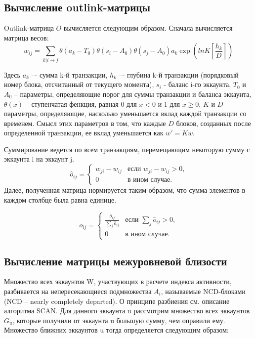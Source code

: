 \documentclass[a4paper,12pt]{article}
\begin{document}
\subsection{Вычисление outlink-матрицы}
Outlink-матрица $O$ вычисляется следующим образом. Сначала вычисляется матрица весов:
$$
w_{ij}=\sum_{k|i \to j} \theta ( a_k - T_0 ) \theta ( s_i - A_0 ) \theta ( s_j - A_0 ) a_k \exp{(lnK [\frac{h_k}{D}])}
$$

Здесь $a_k$ –- сумма k-й транзакции, $h_k$ –- глубина  k-й транзакции (порядковый номер блока, отсчитанный от текущего момента), $s_i$ - баланс i-го эккаунта, $T_0$ и $A_0$ -- параметры, определяющие порог для суммы транзакции и баланса эккаунта, $\theta(x)$ -- ступенчатая фенкция, равная 0 для $x<0$ и 1 для $x \ge 0$, $K$ и  $D$ — параметры, определяющие, насколько уменьшается вклад каждой транзакции со временем. Смысл этих параметров в том, что каждые $D$ блоков, созданных после определенной транзакции, ее вклад уменьшается как $w'=Kw$.

Суммирование ведется по всем транзакциям, перемещающим некоторую сумму с эккаунта i на эккаунт j.
$$
\hat{o}_{ij} = \begin{cases}
 w_{ji}-w_{ij}
 & \text{если $w_{ji}-w_{ij} > 0$,}\\
 0 & \text{в ином случае.}
\end{cases}
$$
Далее, полученная матрица нормируется таким образом, что сумма элементов в каждом столбце была равна единице. 

$$
o_{ij} = \begin{cases}
 \frac{\hat{o}_{ij}} {\sum\limits_{j} \hat{o}_{ij}}
 & \text{если $\sum\limits_{j} \hat{o}_{ij}> 0$,}\\
 0 & \text{в ином случае.}
\end{cases} 
$$

\subsection{Вычисление матрицы межуровневой близости}

Множество всех эккаунтов W, участвующих в расчете индекса активности, разбивается на непересекающиеся подмножества $A_i$, называемые NCD-блоками (NCD – nearly completely departed). О принципе разбиения см. описание алгоритма SCAN. 
Для данного эккаунта u рассмотрим множество всех эккаунтов $G_u$, которые получили от эккаунта u большую сумму, чем оправили ему. Множество ближних эккаунтов u тогда определяется следующим образом:
\end{document}
